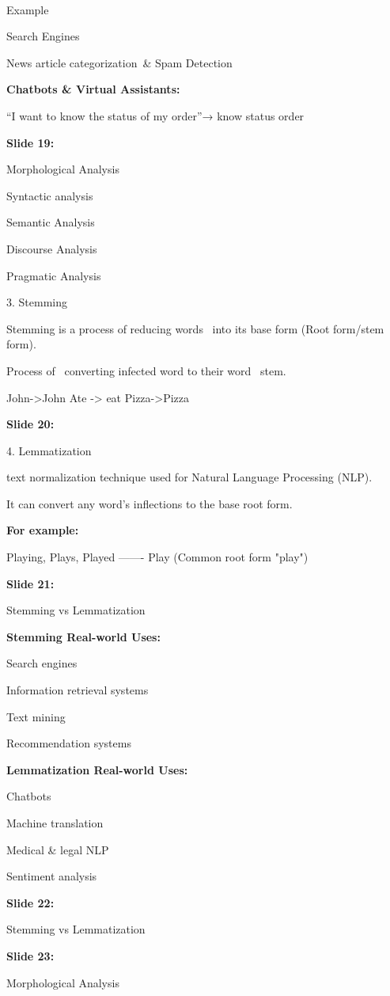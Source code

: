\documentclass[11pt,a4paper]{article}
\begin{document}
​

Example

Search Engines

News article categorization & Spam Detection

\textbf{Chatbots \& Virtual Assistants:} 

“I want to know the status of my order”→ know status order

\textbf{Slide 19:}

Morphological Analysis

Syntactic analysis

Semantic Analysis

Discourse Analysis

Pragmatic Analysis

3. Stemming

Stemming is a process of reducing words  into its base form (Root form/stem form).

Process of  converting infected word to their word  stem.

John->John  Ate -> eat  Pizza->Pizza

\textbf{Slide 20:}

4. Lemmatization

text normalization technique used for Natural Language Processing (NLP).

It can convert any word's inflections to the base root form.

\textbf{For example:} 

Playing, Plays, Played ------- Play (Common root form "play")

\textbf{Slide 21:}

Stemming vs Lemmatization

\textbf{Stemming Real-world Uses:} 

Search engines

Information retrieval systems

Text mining

Recommendation systems

\textbf{Lemmatization Real-world Uses:} 

Chatbots

Machine translation

Medical & legal NLP

Sentiment analysis

\textbf{Slide 22:}

Stemming vs Lemmatization

\textbf{Slide 23:}

Morphological Analysis
\end{document}
